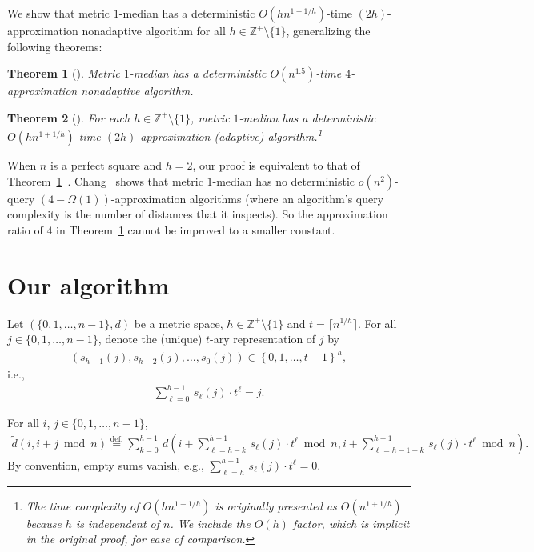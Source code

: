 \documentclass[letterpaper,12pt]{article}
\newtheorem{theorem}{Theorem}
\begin{document}
We show
that {\sc metric $1$-median} has a deterministic
$O(hn^{1+1/h})$-time $(2h)$-approximation nonadaptive algorithm for all
$h\in\mathbb{Z}^+\setminus\{1\}$, generalizing the following theorems:

\begin{theorem}[\cite{Cha13}]\label{mypreviousupperboundresult}
{\sc Metric $1$-median} has a deterministic $O(n^{1.5})$-time
$4$-approximation nonadaptive algorithm.
\end{theorem}

\begin{theorem}[\cite{Wu14}]
For each
$h\in\mathbb{Z}^+\setminus\{1\}$,
{\sc metric $1$-median} has a deterministic $O(hn^{1+1/h})$-time
$(2h)$-approximation (adaptive) algorithm.\footnote{The time complexity of
$O(hn^{1+1/h})$ is originally presented as $O(n^{1+1/h})$ because $h$ is
independent of $n$.
We include the $O(h)$ factor, which is implicit in the original proof,
for ease of comparison.}
\end{theorem}

When $n$ is a perfect square and $h=2$, our proof is equivalent to that of
Theorem~\ref{mypreviousupperboundresult}~\cite{Cha13}.
Chang~\cite{Cha14arXiv} shows that {\sc metric $1$-median} has no
deterministic $o(n^2)$-query $(4-\Omega(1))$-approximation algorithms
(where
an algorithm's
query complexity
is the number of distances that it inspects).
So the approximation ratio of $4$ in Theorem~\ref{mypreviousupperboundresult}
cannot be
improved
to
a
smaller
constant.


\section{Our algorithm}

Let $(\{0,1,\ldots,n-1\},d)$ be a metric space,
$h\in\mathbb{Z}^+\setminus\{1\}$ and $t=\lceil n^{1/h}\rceil$.
For all $j\in \{0,1,\ldots,n-1\}$,
denote
the
(unique)
$t$-ary representation of $j$
by
\begin{eqnarray}
\left(s_{h-1}(j),s_{h-2}(j),\ldots,s_0(j)\right)
\in\left\{0,1,\ldots,t-1\right\}^h,
\nonumber
\end{eqnarray}
i.e.,
\begin{eqnarray}
\sum_{\ell=0}^{h-1}\,s_\ell(j)\cdot t^\ell=j.
\label{multiaryrepresentation}
\end{eqnarray}

For all $i$, $j\in\{0,1,\ldots,n-1\}$,
\begin{eqnarray}
\tilde{d}\left(i,i+j\bmod{n}\right)
\stackrel{\text{def.}}{=}
\sum_{k=0}^{h-1}\, d\left(i+\sum_{\ell=h-k}^{h-1}\, s_\ell(j)\cdot
t^\ell\bmod{n},
i+\sum_{\ell=h-1-k}^{h-1}\, s_\ell(j)\cdot t^\ell\bmod{n}\right).
\label{pseudodistance}
\end{eqnarray}
By convention,
empty sums vanish, e.g.,
$\sum_{\ell=h}^{h-1}\,s_\ell(j)\cdot t^\ell=0$.
\end{document}
